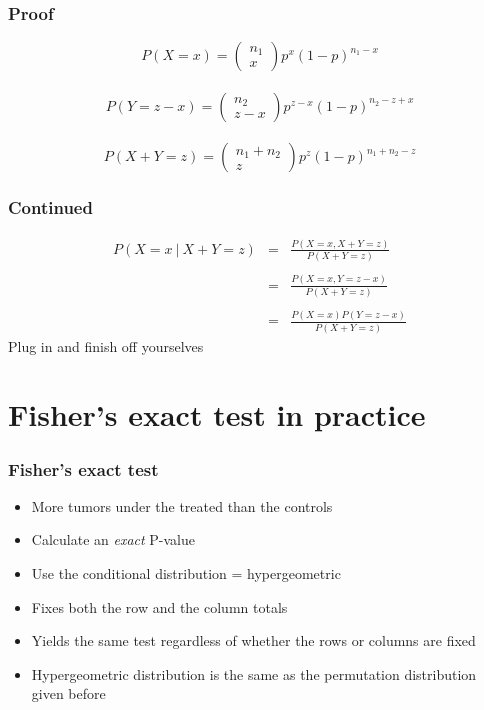 \documentclass[aspectratio=169]{beamer}
\begin{document}
\begin{frame}\frametitle{Proof}
$$
P(X = x) = \left( \begin{array}{c} n_1 \\ x \end{array} \right) p^x(1-p)^{n_1 - x}
$$ \ \\
$$
P(Y = z-x) = \left( \begin{array}{c} n_2 \\ z-x \end{array} \right) p^{z-x}(1-p)^{n_2 - z + x}
$$ \ \\
$$
P(X + Y = z) = \left( \begin{array}{c} n_1 + n_2 \\ z \end{array} \right) p^z(1-p)^{n_1+n_2 -z}
$$ 
\end{frame}
\begin{frame}\frametitle{Continued}
\begin{eqnarray*}
P(X = x ~ | ~ X + Y = z) & = &\frac{P(X = x, X + Y = z)}{P(X + Y = z)} \\
                         &   & \\
                         & = &\frac{P(X = x, Y = z - x)}{P(X + Y = z)} \\
                         &   & \\
                         & = &\frac{P(X = x)P(Y = z-x)}{P(X + Y = z)}
\end{eqnarray*}
Plug in and finish off yourselves
\end{frame}


\section{Fisher's exact test in practice}
\begin{frame}\frametitle{Fisher's exact test}
  \begin{itemize}
  \item More tumors under the treated than the controls
  \item Calculate an {\em exact} P-value 
  \item Use the conditional distribution = hypergeometric
  \item Fixes both the row and the column totals
  \item Yields the same test regardless of whether the
    rows or columns are fixed
  \item Hypergeometric distribution is the same as the
    permutation distribution given before
\end{itemize}
\end{frame}
\end{document}
